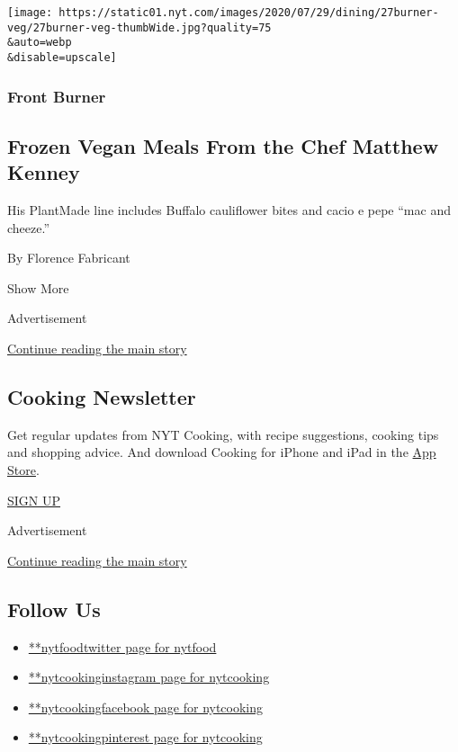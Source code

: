 \begin{enumerate}
  \texttt{[image: https://static01.nyt.com/images/2020/07/29/dining/27burner-veg/27burner-veg-thumbWide.jpg?quality=75\\\&auto=webp\\\&disable=upscale]}

  \hypertarget{front-burner-4}{%
  \subsubsection{Front Burner}\label{front-burner-4}}

  \hypertarget{frozen-vegan-meals-from-the-chef-matthew-kenney}{%
  \subsection{Frozen Vegan Meals From the Chef Matthew
  Kenney}\label{frozen-vegan-meals-from-the-chef-matthew-kenney}}

  His PlantMade line includes Buffalo cauliflower bites and cacio e pepe
  ``mac and cheeze.''

  By Florence Fabricant
\end{enumerate}

Show More

Advertisement

\protect\hyperlink{after-mid2}{Continue reading the main story}

\hypertarget{cooking-newsletter}{%
\subsection{Cooking Newsletter}\label{cooking-newsletter}}

Get regular updates from NYT Cooking, with recipe suggestions, cooking
tips and shopping advice. And download Cooking for iPhone and iPad in
the
\href{https://itunes.apple.com/us/app/nyt-cooking-recipes-from-new/id911422904?mt=8}{App
Store}.

\href{/newsletters/signup/CK}{SIGN UP}

Advertisement

\protect\hyperlink{after-mktg}{Continue reading the main story}

\hypertarget{follow-us}{%
\subsection{Follow Us}\label{follow-us}}

\begin{itemize}
\tightlist
\item
  \href{https://twitter.com/nytfood}{**nytfoodtwitter page for nytfood}
\item
  \href{https://instagram.com/nytcooking}{**nytcookinginstagram page for
  nytcooking}
\item
  \href{https://www.facebook.com/nytcooking}{**nytcookingfacebook page
  for nytcooking}
\item
  \href{https://pinterest.com/nytcooking}{**nytcookingpinterest page for
  nytcooking}
\end{itemize}

